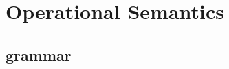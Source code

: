 \documentclass{article}
\begin{document}
  \section{Operational Semantics}
    \subsection{grammar}
    \begin{grammar}
    \end{grammar}
\end{document}

